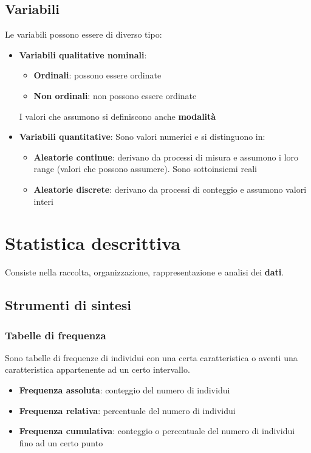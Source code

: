 \documentclass[a4paper]{article}
\theoremstyle{break}
\theoremstyle{break}
\theoremstyle{break}
\theoremstyle{break}
\begin{document}
\subsection{Variabili}
Le variabili possono essere di diverso tipo:
\begin{itemize}
	\item \textbf{Variabili qualitative nominali}:
	      \begin{itemize}
		      \item \textbf{Ordinali}: possono essere ordinate
		      \item \textbf{Non ordinali}: non possono essere ordinate
	      \end{itemize}
      I valori che assumono si definiscono anche \textbf{modalità}
	\item \textbf{Variabili quantitative}:
    Sono valori numerici e si distinguono in:
	      \begin{itemize}
		      \item \textbf{Aleatorie continue}: derivano da processi di misura e assumono
		            i loro range (valori che possono assumere). Sono sottoinsiemi reali
		      \item \textbf{Aleatorie discrete}: derivano da processi di conteggio e
            assumono valori interi
	      \end{itemize}
\end{itemize}


\section{Statistica descrittiva}
Consiste nella raccolta, organizzazione, rappresentazione e analisi dei \textbf{dati}.

\subsection{Strumenti di sintesi}
\subsubsection{Tabelle di frequenza}
Sono tabelle di frequenze di individui con una certa caratteristica o aventi una caratteristica
appartenente ad un certo intervallo.
\begin{itemize}
	\item \textbf{Frequenza assoluta}: conteggio del numero di individui
	\item \textbf{Frequenza relativa}: percentuale del numero di individui
	\item \textbf{Frequenza cumulativa}: conteggio o percentuale del numero di individui
	      fino ad un certo punto
\end{itemize}
\end{document}
